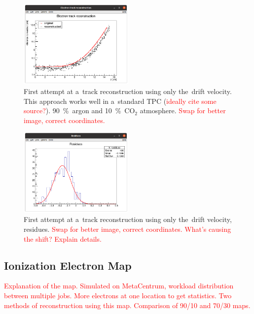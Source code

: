 \documentclass[]{article}
\begin{document}
	\begin{figure}
		\centering
		\includegraphics[width=0.5\textwidth]{9010_xz.png}
		\caption{First attempt at a~track reconstruction using only the~drift velocity. This approach works well in a~standard TPC (\textcolor{red}{ideally cite some source?}). 90~\%~argon and 10~\%~CO$_2$ atmosphere. \textcolor{red}{Swap for better image, correct coordinates.}}
		\label{fig:9010xz}
	\end{figure}
	
	\begin{figure}
		\centering
		\includegraphics[width=0.5\textwidth]{9010_res.png}
		\caption{First attempt at a~track reconstruction using only the~drift velocity, residues. \textcolor{red}{Swap for better image, correct coordinates. What's causing the shift? Explain details.}}
		\label{fig:9010res}
	\end{figure}
	
	\subsection{Ionization Electron Map}
	\label{sec:map}
	\textcolor{red}{Explanation of the map. Simulated on MetaCentrum, workload distribution between multiple jobs. More electrons at one location to get statistics. Two methods of reconstruction using this map. Comparison of 90/10 and 70/30 maps.}
	
\end{document}
